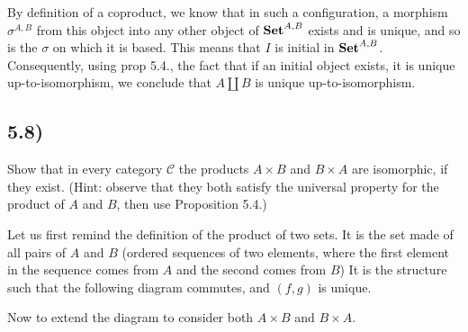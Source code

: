 By definition of a coproduct, we know that in such a configuration, a morphism $\sigma^{A,B}$ from this object into any other object of $\text{\textbf{Set}}^{A,B}$ exists and is unique, and so is the $\sigma$ on which it is based. This means that $I$ is initial in $\text{\textbf{Set}}^{A,B}$. Consequently, using prop 5.4., the fact that if an initial object exists, it is unique up-to-isomorphism, we conclude that $A \coprod B$ is unique up-to-isomorphism.



\subsection*{5.8)}

Show that in every category $\mathcal{C}$ the products $A \times B$ and $B \times A$ are isomorphic, if they exist. (Hint: observe that they both satisfy the universal property for the product of $A$ and $B$, then use Proposition 5.4.)

Let us first remind the definition of the product of two sets. It is the set made of all pairs of $A$ and $B$ (ordered sequences of two elements, where the first element in the sequence comes from $A$ and the second comes from $B$) It is the structure such that the following diagram commutes, and $(f,g)$ is unique.


Now to extend the diagram to consider both $A \times B$ and $B \times A$.

